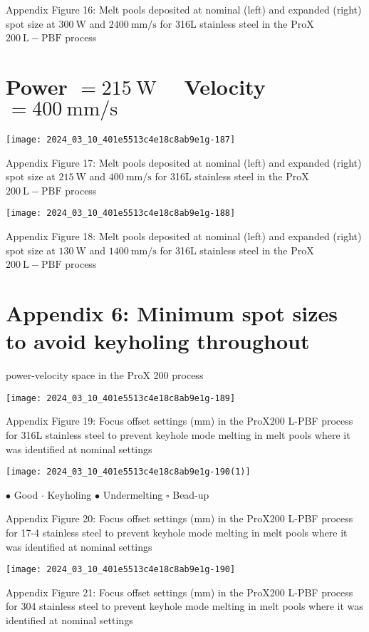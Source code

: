\documentclass[10pt]{article}
\begin{document}
Appendix Figure 16: Melt pools deposited at nominal (left) and expanded (right) spot size at $300 \mathrm{~W}$ and $2400 \mathrm{~mm} / \mathrm{s}$ for 316L stainless steel in the ProX $200 \mathrm{~L}-\mathrm{PBF}$ process

\section*{Power $=215 \mathrm{~W} \quad$ Velocity $=400 \mathrm{~mm} / \mathrm{s}$}
\begin{center}
\texttt{[image: 2024\_03\_10\_401e5513c4e18c8ab9e1g-187]}
\end{center}

Appendix Figure 17: Melt pools deposited at nominal (left) and expanded (right) spot size at $215 \mathrm{~W}$ and $400 \mathrm{~mm} / \mathrm{s}$ for 316L stainless steel in the ProX $200 \mathrm{~L}-\mathrm{PBF}$ process

\begin{center}
\texttt{[image: 2024\_03\_10\_401e5513c4e18c8ab9e1g-188]}
\end{center}

Appendix Figure 18: Melt pools deposited at nominal (left) and expanded (right) spot size at $130 \mathrm{~W}$ and $1400 \mathrm{~mm} / \mathrm{s}$ for 316L stainless steel in the ProX $200 \mathrm{~L}-\mathrm{PBF}$ process

\section*{Appendix 6: Minimum spot sizes to avoid keyholing throughout}
power-velocity space in the ProX 200 process

\begin{center}
\texttt{[image: 2024\_03\_10\_401e5513c4e18c8ab9e1g-189]}
\end{center}

Appendix Figure 19: Focus offset settings (mm) in the ProX200 L-PBF process for 316L stainless steel to prevent keyhole mode melting in melt pools where it was identified at nominal settings

\begin{center}
\texttt{[image: 2024\_03\_10\_401e5513c4e18c8ab9e1g-190(1)]}
\end{center}

$\bullet$ Good $\cdot$ Keyholing $\bullet$ Undermelting $\square$ Bead-up

Appendix Figure 20: Focus offset settings (mm) in the ProX200 L-PBF process for 17-4 stainless steel to prevent keyhole mode melting in melt pools where it was identified at nominal settings

\begin{center}
\texttt{[image: 2024\_03\_10\_401e5513c4e18c8ab9e1g-190]}
\end{center}

Appendix Figure 21: Focus offset settings (mm) in the ProX200 L-PBF process for 304 stainless steel to prevent keyhole mode melting in melt pools where it was identified at nominal settings
\end{document}

